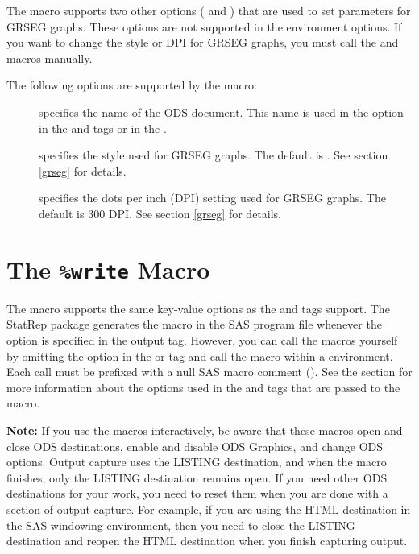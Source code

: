 \documentclass[article,oneside]{memoir}
\newcommand*{\StatRep}{\textsf{StatRep}\xspace}
\begin{document}
  The  macro supports two other options ( and ) that are used to
  set parameters for GRSEG graphs. These options are not supported in the
   environment options. If you want to change the style or DPI for
  GRSEG graphs, you must call the  and  macros manually.

  The following options are supported by the  macro:
 \begin{description}
 \item[] specifies the name of the ODS document.
  This name is used in the  option in the  and  tags
  or in the .

 \item[] specifies the style used for GRSEG graphs.
 The default is . See section \ref{grseg} for details.

 \item[] specifies the dots per inch (DPI) setting used for GRSEG graphs.
  The default is 300 DPI. See section \ref{grseg} for details.
 \end{description}


  \section{The \texttt{\%write} Macro}
  The  macro supports the same key-value options as the  and
   tags support.
  The \StatRep package generates the  macro in the SAS program
  file whenever the  option is specified in the output tag.
  However, you can call the macros
  yourself by omitting the  option in the  or 
  tag and call the macro within a  environment. Each call must be prefixed
  with a null SAS macro comment (\Code{\%*;}).
See the section  for more information about the options used in the
 and  tags that are passed to the  macro.


\vspace*{1em}\noindent\textbf{Note:} If you use the macros interactively, be aware that
these macros open and close ODS destinations,
enable and disable ODS Graphics, and change ODS options.  Output capture uses the
LISTING destination, and when the  macro finishes, only the
LISTING destination remains open.
If you need other ODS destinations for your work, you need to reset them
when you are done with a section of output capture.  For example,
if you are using the HTML destination
in the SAS windowing environment, then you need to
close the LISTING destination and reopen the HTML destination when you finish
capturing output.
\end{document}
